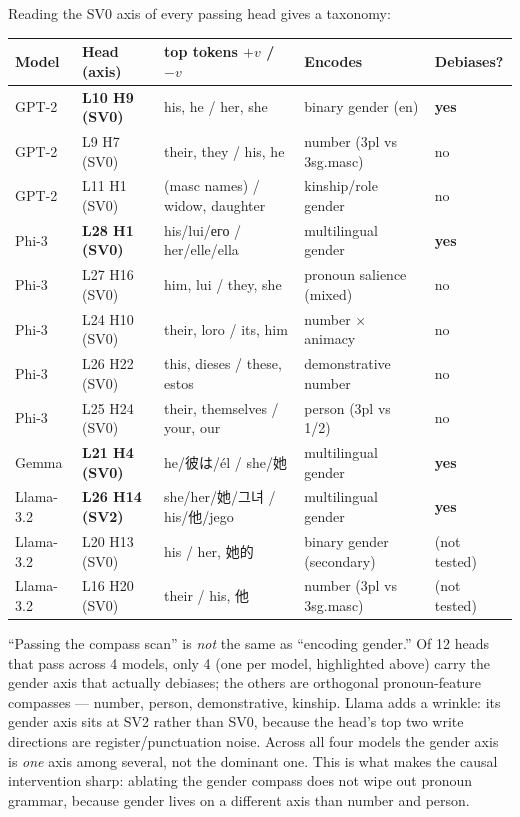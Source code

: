 \documentclass[11pt]{article}
\begin{document}
Reading the SV0 axis of every passing head gives a taxonomy:

\begin{center}
\small
\begin{tabular}{lllll}
\toprule
Model & Head (axis) & top tokens $+v$ / $-v$ & Encodes & Debiases? \\
\midrule
GPT-2 & \textbf{L10 H9 (SV0)} & his, he / her, she & binary gender (en) & \textbf{yes} \\
GPT-2 & L9 H7 (SV0) & their, they / his, he & number (3pl vs 3sg.masc) & no \\
GPT-2 & L11 H1 (SV0) & (masc names) / widow, daughter & kinship/role gender & no \\
\midrule
Phi-3 & \textbf{L28 H1 (SV0)} & his/lui/его / her/elle/ella & multilingual gender & \textbf{yes} \\
Phi-3 & L27 H16 (SV0) & him, lui / they, she & pronoun salience (mixed) & no \\
Phi-3 & L24 H10 (SV0) & their, loro / its, him & number $\times$ animacy & no \\
Phi-3 & L26 H22 (SV0) & this, dieses / these, estos & demonstrative number & no \\
Phi-3 & L25 H24 (SV0) & their, themselves / your, our & person (3pl vs 1/2) & no \\
\midrule
Gemma & \textbf{L21 H4 (SV0)} & he/彼は/él / she/她 & multilingual gender & \textbf{yes} \\
\midrule
Llama-3.2 & \textbf{L26 H14 (SV2)} & she/her/她/그녀 / his/他/jego & multilingual gender & \textbf{yes} \\
Llama-3.2 & L20 H13 (SV0) & his / her, 她的 & binary gender (secondary) & (not tested) \\
Llama-3.2 & L16 H20 (SV0) & their / his, 他 & number (3pl vs 3sg.masc) & (not tested) \\
\bottomrule
\end{tabular}
\end{center}

\begin{tcolorbox}[findbox]
``Passing the compass scan'' is \emph{not} the same as ``encoding
gender.'' Of 12 heads that pass across 4 models, only 4 (one per
model, highlighted above) carry the gender axis that actually
debiases; the others are orthogonal pronoun-feature compasses ---
number, person, demonstrative, kinship. Llama adds a wrinkle: its
gender axis sits at SV2 rather than SV0, because the head's top two
write directions are register/punctuation noise. Across all four
models the gender axis is \emph{one} axis among several, not the
dominant one. This is what makes the causal intervention sharp:
ablating the gender compass does not wipe out pronoun grammar,
because gender lives on a different axis than number and person.
\end{tcolorbox}
\end{document}
